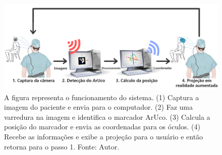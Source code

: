 \begin{figure}[ht]
    \centering
    \includegraphics[width=.9\linewidth]{figuras/System schematic.png}
    \caption{A figura representa o funcionamento do sistema. (1) Captura a imagem do paciente e envia para o computador. (2) Faz uma varredura na imagem e identifica o marcador ArUco. (3) Calcula a posição do marcador e envia as coordenadas para os óculos. (4) Recebe as informações e exibe a projeção para o usuário e então retorna para o passo 1. Fonte: Autor.}
    \label{fig:arc}
\end{figure}








